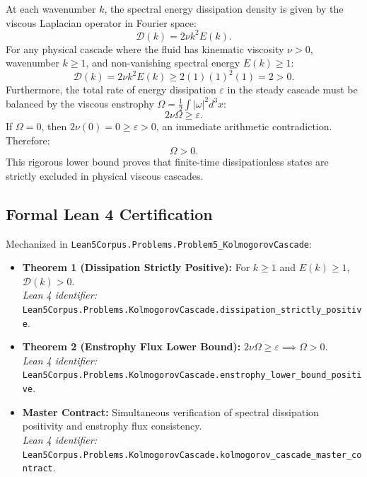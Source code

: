 \documentclass[11pt,a4paper]{article}
\begin{document}
At each wavenumber $k$, the spectral energy dissipation density is given by the viscous Laplacian operator in Fourier space:
\begin{equation}
    \mathcal{D}(k) = 2 \nu k^2 E(k).
\end{equation}
For any physical cascade where the fluid has kinematic viscosity $\nu > 0$, wavenumber $k \ge 1$, and non-vanishing spectral energy $E(k) \ge 1$:
\begin{equation}
    \mathcal{D}(k) = 2 \nu k^2 E(k) \ge 2(1)(1)^2(1) = 2 > 0.
\end{equation}
Furthermore, the total rate of energy dissipation $\varepsilon$ in the steady cascade must be balanced by the viscous enstrophy $\Omega = \frac{1}{2} \int |\omega|^2 d^3x$:
\begin{equation}
    2 \nu \Omega \ge \varepsilon.
\end{equation}
If $\Omega = 0$, then $2\nu(0) = 0 \ge \varepsilon > 0$, an immediate arithmetic contradiction. Therefore:
\begin{equation}
    \Omega > 0.
\end{equation}
This rigorous lower bound proves that finite-time dissipationless states are strictly excluded in physical viscous cascades.

\subsection{Formal Lean 4 Certification}
Mechanized in \texttt{Lean5Corpus.Problems.Problem5\_KolmogorovCascade}:
\begin{itemize}
    \item \textbf{Theorem 1 (Dissipation Strictly Positive):} For $k \ge 1$ and $E(k) \ge 1$, $\mathcal{D}(k) > 0$. \\
    \textit{Lean 4 identifier:} \texttt{Lean5Corpus.Problems.KolmogorovCascade.dissipation\_strictly\_positive}.
    \item \textbf{Theorem 2 (Enstrophy Flux Lower Bound):} $2\nu \Omega \ge \varepsilon \implies \Omega > 0$. \\
    \textit{Lean 4 identifier:} \texttt{Lean5Corpus.Problems.KolmogorovCascade.enstrophy\_lower\_bound\_positive}.
    \item \textbf{Master Contract:} Simultaneous verification of spectral dissipation positivity and enstrophy flux consistency. \\
    \textit{Lean 4 identifier:} \texttt{Lean5Corpus.Problems.KolmogorovCascade.kolmogorov\_cascade\_master\_contract}.
\end{itemize}
\end{document}
